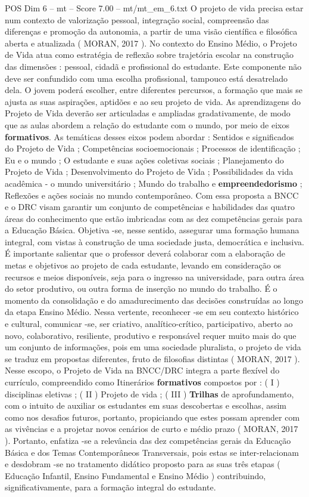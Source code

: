 \begin{textsample}{POS Dim 6 – mt – Score 7.00 – mt/mt\_em\_6.txt}
O projeto de vida precisa estar num contexto de valorização pessoal, integração social, compreensão das diferenças e promoção da autonomia, a partir de uma visão científica e filosófica aberta e atualizada ( MORAN, 2017 ).
No contexto do Ensino Médio, o Projeto de Vida atua como estratégia de reflexão sobre trajetória escolar na construção das dimensões : pessoal, cidadã e profissional do estudante.
Este componente não deve ser confundido com uma escolha profissional, tampouco está desatrelado dela.
O jovem poderá escolher, entre diferentes percursos, a formação que mais se ajusta as suas aspirações, aptidões e ao seu projeto de vida.
As aprendizagens do Projeto de Vida deverão ser articuladas e ampliadas gradativamente, de modo que as aulas abordem a relação do estudante com o mundo, por meio de eixos \textbf{formativos}.
As temáticas desses eixos podem abordar : Sentidos e significados do Projeto de Vida ; Competências socioemocionais ; Processos de identificação ; Eu e o mundo ; O estudante e suas ações coletivas sociais ; Planejamento do Projeto de Vida ; Desenvolvimento do Projeto de Vida ; Possibilidades da vida acadêmica - o mundo universitário ; Mundo do trabalho e \textbf{empreendedorismo} ; Reflexões e ações sociais no mundo contemporâneo.
Com essa proposta a BNCC e o DRC visam garantir um conjunto de competências e habilidades das quatro áreas do conhecimento que estão imbricadas com as dez competências gerais para a Educação Básica.
Objetiva -se, nesse sentido, assegurar uma formação humana integral, com vistas à construção de uma sociedade justa, democrática e inclusiva.
É importante salientar que o professor deverá colaborar com a elaboração de metas e objetivos ao projeto de cada estudante, levando em consideração os recursos e meios disponíveis, seja para o ingresso na universidade, para outra área do setor produtivo, ou outra forma de inserção no mundo do trabalho.
É o momento da consolidação e do amadurecimento das decisões construídas ao longo da etapa Ensino Médio.
Nessa vertente, reconhecer -se em seu contexto histórico e cultural, comunicar -se, ser criativo, analítico-crítico, participativo, aberto ao novo, colaborativo, resiliente, produtivo e responsável requer muito mais do que um conjunto de informações, pois em uma sociedade pluralista, o projeto de vida se traduz em propostas diferentes, fruto de filosofias distintas ( MORAN, 2017 ).
Nesse escopo, o Projeto de Vida na BNCC/DRC integra a parte flexível do currículo, compreendido como Itinerários \textbf{formativos} compostos por : ( I ) disciplinas eletivas ; ( II ) Projeto de vida ; ( III ) \textbf{Trilhas} de aprofundamento, com o intuito de auxiliar os estudantes em suas descobertas e escolhas, assim como nos desafios futuros, portanto, propiciando que estes possam aprender com as vivências e a projetar novos cenários de curto e médio prazo ( MORAN, 2017 ).
Portanto, enfatiza -se a relevância das dez competências gerais da Educação Básica e dos Temas Contemporâneos Transversais, pois estas se inter-relacionam e desdobram -se no tratamento didático proposto para as suas três etapas ( Educação Infantil, Ensino Fundamental e Ensino Médio ) contribuindo, significativamente, para a formação integral do estudante.


\end{textsample}

